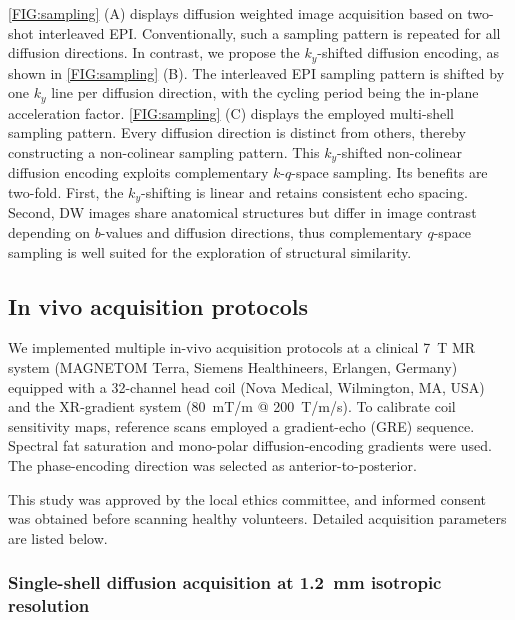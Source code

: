 \documentclass[preprint,12pt,authoryear,review]{elsarticle}
\begin{document}
	\cref{FIG:sampling} (A) displays diffusion weighted image acquisition
	based on two-shot interleaved EPI.
	Conventionally, such a sampling pattern is repeated for all diffusion directions.
	In contrast, we propose the $k_y$-shifted diffusion encoding,
	as shown in \cref{FIG:sampling} (B).
	The interleaved EPI sampling pattern is shifted by one $k_y$ line
	per diffusion direction,
	with the cycling period being the in-plane acceleration factor.
        \cref{FIG:sampling} (C) displays the employed multi-shell sampling pattern.
	Every diffusion direction is distinct from others,
        thereby constructing a non-colinear sampling pattern.
	This $k_y$-shifted non-colinear diffusion encoding exploits
        complementary $k$-$q$-space sampling. Its benefits are two-fold.
        First, the $k_y$-shifting is linear and retains consistent echo spacing.
        Second, DW images share anatomical structures but differ in image contrast
        depending on $b$-values and diffusion directions,
        thus complementary $q$-space sampling is well suited
        for the exploration of structural similarity.

	\subsection{In vivo acquisition protocols}

	We implemented multiple in-vivo acquisition protocols
	at a clinical \SI{7}{\tesla} MR system
        (MAGNETOM Terra, Siemens Healthineers, Erlangen, Germany)
	equipped with a 32-channel head coil (Nova Medical, Wilmington, MA, USA)
	and the XR-gradient system
	(\SI{80}{\milli\tesla / \meter} @ \SI{200}{\tesla / \meter / \second}).
	To calibrate coil sensitivity maps, reference scans employed a gradient-echo (GRE) sequence.
	Spectral fat saturation and mono-polar diffusion-encoding gradients were used.
	The phase-encoding direction was selected as anterior-to-posterior.

	This study was approved by the local ethics committee,
	and informed consent was obtained before scanning healthy volunteers.
	Detailed acquisition parameters are listed below.


	\subsubsection{Single-shell diffusion acquisition at \SI{1.2}{\milli\meter} isotropic resolution}
	\label{SEC:ACQ1.2mm}
\end{document}
